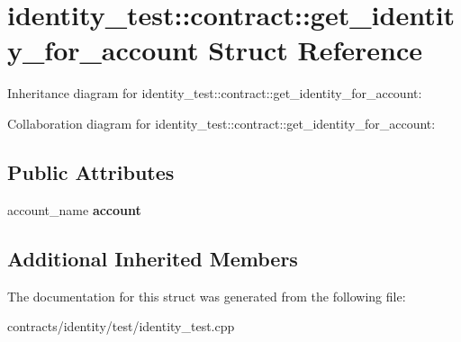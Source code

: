 \hypertarget{structidentity__test_1_1contract_1_1get__identity__for__account}{}\section{identity\+\_\+test\+:\+:contract\+:\+:get\+\_\+identity\+\_\+for\+\_\+account Struct Reference}
\label{structidentity__test_1_1contract_1_1get__identity__for__account}


Inheritance diagram for identity\+\_\+test\+:\+:contract\+:\+:get\+\_\+identity\+\_\+for\+\_\+account\+:


Collaboration diagram for identity\+\_\+test\+:\+:contract\+:\+:get\+\_\+identity\+\_\+for\+\_\+account\+:
\subsection*{Public Attributes}
\begin{DoxyCompactItemize}
\item 
\mbox{\label{structidentity__test_1_1contract_1_1get__identity__for__account_a9f3719ebf1717fb1f0a8530f83bf8177}} 
account\+\_\+name {\bfseries account}
\end{DoxyCompactItemize}
\subsection*{Additional Inherited Members}


The documentation for this struct was generated from the following file\+:\begin{DoxyCompactItemize}
\item 
contracts/identity/test/identity\+\_\+test.\+cpp\end{DoxyCompactItemize}
